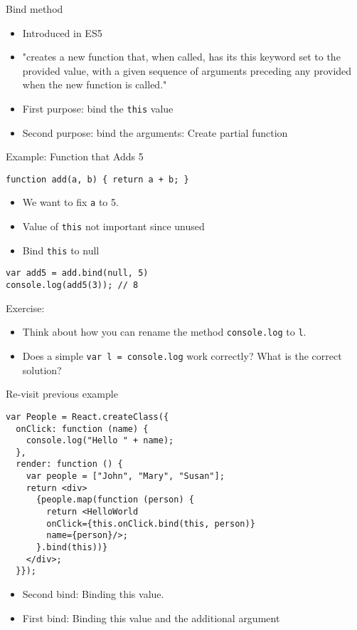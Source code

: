\documentclass[presentation]{beamer}
\begin{document}
\begin{frame}[fragile,label={sec:orgheadline12}]{Bind method}
 \begin{itemize}
\item Introduced in ES5
\item "creates a new function that, when called, has its this keyword set to the
provided value, with a given sequence of arguments preceding any provided
when the new function is called."
\item First purpose: bind the \texttt{this} value
\item Second purpose: bind the arguments: Create \alert{partial} function
\end{itemize}
\end{frame}

\begin{frame}[fragile,label={sec:orgheadline13}]{Example: Function that Adds 5}
 \begin{verbatim}
function add(a, b) { return a + b; }
\end{verbatim}

\begin{itemize}
\item We want to fix \texttt{a} to 5.
\item Value of \texttt{this} not important since unused
\item Bind \texttt{this} to null
\end{itemize}

\begin{verbatim}
var add5 = add.bind(null, 5)
console.log(add5(3)); // 8
\end{verbatim}
\end{frame}


\begin{frame}[fragile,label={sec:orgheadline14}]{Exercise:}
 \begin{itemize}
\item Think about how you can rename the method \texttt{console.log} to \texttt{l}.
\item Does a simple \texttt{var l = console.log} work correctly? What is the correct
solution?
\end{itemize}
\end{frame}

\begin{frame}[fragile,label={sec:orgheadline15}]{Re-visit previous example}
 \begin{verbatim}
var People = React.createClass({
  onClick: function (name) {
    console.log("Hello " + name);
  },
  render: function () {
    var people = ["John", "Mary", "Susan"];
    return <div>
      {people.map(function (person) {
        return <HelloWorld
        onClick={this.onClick.bind(this, person)}
        name={person}/>;
      }.bind(this))}
    </div>;
  }});
\end{verbatim}

\begin{itemize}
\item Second bind: Binding this value.
\item First bind: Binding this value and the additional argument
\end{itemize}
\end{frame}
\end{document}
